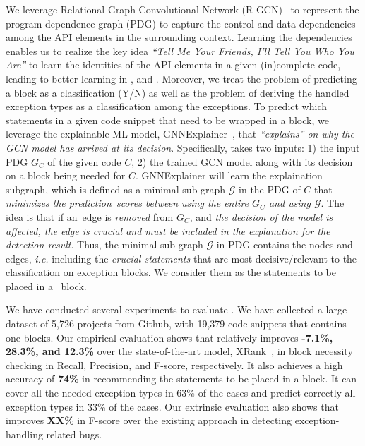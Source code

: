 We leverage Relational Graph Convolutional Network (R-GCN)~\cite{rgcn}
to represent the program dependence graph (PDG) to capture the control
and data dependencies among the API elements in the surrounding
context. Learning the dependencies enables us to realize the
key idea {\em ``Tell Me Your Friends, I'll Tell You Who You Are''} to
learn the identities of the API elements in a given (in)complete code,
leading to better learning in {\xblock}, {\xstate} and
{\xtype}. Moreover, we treat the problem of predicting a
 block as a classification (Y/N) as well as the
problem of deriving the handled exception types as a classification
among the exceptions.
%
To predict which statements in a given code snippet that need to be
wrapped in a  block, we leverage the explainable ML
model, GNNExplainer~\cite{GNNExplainer}, that {\em ``explains'' on why
  the GCN model has arrived at its decision}. Specifically, {\tool}
takes two inputs: 1) the input PDG $G_C$ of the given code $C$,
2) the trained GCN model along with its decision on a
 block being needed for $C$.
%
GNNExplainer will learn the explaination subgraph, which is
defined as a minimal sub-graph $\mathcal{G}$ in the PDG of $C$ that
{\em minimizes the prediction~scores between using the entire $G_C$
  and using $\mathcal{G}$}. The idea is that if an~edge is {\em
  removed} from $G_C$, and {\em the decision of the model is affected,
  the edge is crucial and must be included in the explanation for
  the detection result}. Thus, the minimal sub-graph $\mathcal{G}$ in
PDG contains the nodes and edges, {\em i.e.}  including the {\em
  crucial statements} that are most decisive/relevant to the
classification on exception blocks. We consider them as the statements
to be placed in a ~block.

We have conducted several experiments to evaluate {\tool}. We have
collected a large dataset of 5,726 projects from Github, with 19,379 code snippets that contains one  blocks.
%
Our empirical evaluation shows that {\tool} relatively improves {\bf
  -7.1\%, 28.3\%, and 12.3\%} over the state-of-the-art model,
XRank~\cite{xrank-fse20}, in  block necessity checking
in Recall, Precision, and F-score, respectively. It also achieves a
high accuracy of {\bf 74\%} in recommending the statements to be
placed in a  block. It can cover all the needed
exception types in 63\% of the cases and predict correctly all
exception types in 33\% of the cases. Our extrinsic evaluation also
shows that {\tool} improves {\bf XX\%} in F-score over the existing
approach in detecting exception-handling related bugs.

